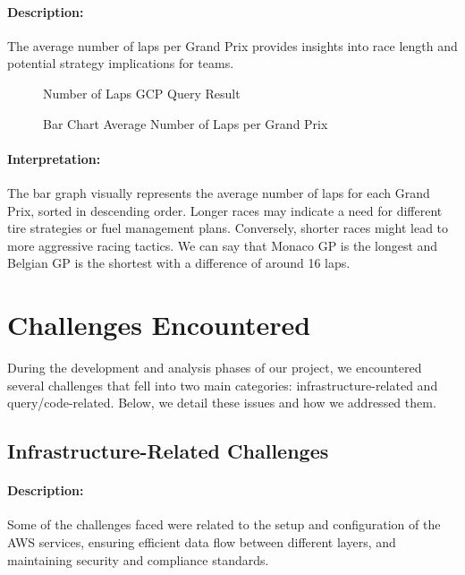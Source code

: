 \documentclass{article}
\begin{document}
\paragraph{Description:}
The average number of laps per Grand Prix provides insights into race length and potential strategy implications for teams.

\begin{figure}[H]
    \centering
    \caption{Number of Laps GCP Query Result}
\end{figure}

\begin{figure}[H]
    \centering
    \caption{Bar Chart Average Number of Laps per Grand Prix}
\end{figure}

\paragraph{Interpretation:}
The bar graph visually represents the average number of laps for each Grand Prix, sorted in descending order. Longer races may indicate a need for different tire strategies or fuel management plans. Conversely, shorter races might lead to more aggressive racing tactics. We can say that Monaco GP is the longest and Belgian GP is the shortest with a difference of around 16 laps.

\section{Challenges Encountered}
During the development and analysis phases of our project, we encountered several challenges that fell into two main categories: infrastructure-related and query/code-related. Below, we detail these issues and how we addressed them.

\subsection{Infrastructure-Related Challenges}
\paragraph{Description:}
Some of the challenges faced were related to the setup and configuration of the AWS services, ensuring efficient data flow between different layers, and maintaining security and compliance standards.
\end{document}
